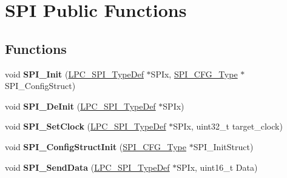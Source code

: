 \hypertarget{group___s_p_i___public___functions}{\section{\-S\-P\-I \-Public \-Functions}
\label{group___s_p_i___public___functions}
}
\subsection*{\-Functions}
\begin{DoxyCompactItemize}
\item 
\hypertarget{group___s_p_i___public___functions_gacc525d0fb68783cb8f1f6e4a8aafb802}{void {\bfseries \-S\-P\-I\-\_\-\-Init} (\hyperlink{struct_l_p_c___s_p_i___type_def}{\-L\-P\-C\-\_\-\-S\-P\-I\-\_\-\-Type\-Def} $\ast$\-S\-P\-Ix, \hyperlink{struct_s_p_i___c_f_g___type}{\-S\-P\-I\-\_\-\-C\-F\-G\-\_\-\-Type} $\ast$\-S\-P\-I\-\_\-\-Config\-Struct)}\label{group___s_p_i___public___functions_gacc525d0fb68783cb8f1f6e4a8aafb802}

\item 
\hypertarget{group___s_p_i___public___functions_gad69565a7837b400d57b41f1c915a0ffd}{void {\bfseries \-S\-P\-I\-\_\-\-De\-Init} (\hyperlink{struct_l_p_c___s_p_i___type_def}{\-L\-P\-C\-\_\-\-S\-P\-I\-\_\-\-Type\-Def} $\ast$\-S\-P\-Ix)}\label{group___s_p_i___public___functions_gad69565a7837b400d57b41f1c915a0ffd}

\item 
\hypertarget{group___s_p_i___public___functions_ga037916fc546ae3e40e7599e4709be5e6}{void {\bfseries \-S\-P\-I\-\_\-\-Set\-Clock} (\hyperlink{struct_l_p_c___s_p_i___type_def}{\-L\-P\-C\-\_\-\-S\-P\-I\-\_\-\-Type\-Def} $\ast$\-S\-P\-Ix, uint32\-\_\-t target\-\_\-clock)}\label{group___s_p_i___public___functions_ga037916fc546ae3e40e7599e4709be5e6}

\item 
\hypertarget{group___s_p_i___public___functions_ga647f575ab1548b4923c2fb81b727a3b1}{void {\bfseries \-S\-P\-I\-\_\-\-Config\-Struct\-Init} (\hyperlink{struct_s_p_i___c_f_g___type}{\-S\-P\-I\-\_\-\-C\-F\-G\-\_\-\-Type} $\ast$\-S\-P\-I\-\_\-\-Init\-Struct)}\label{group___s_p_i___public___functions_ga647f575ab1548b4923c2fb81b727a3b1}

\item 
\hypertarget{group___s_p_i___public___functions_ga4efab5e28246cb68960446331bbb26a5}{void {\bfseries \-S\-P\-I\-\_\-\-Send\-Data} (\hyperlink{struct_l_p_c___s_p_i___type_def}{\-L\-P\-C\-\_\-\-S\-P\-I\-\_\-\-Type\-Def} $\ast$\-S\-P\-Ix, uint16\-\_\-t \-Data)}\label{group___s_p_i___public___functions_ga4efab5e28246cb68960446331bbb26a5}


\end{DoxyCompactItemize}
